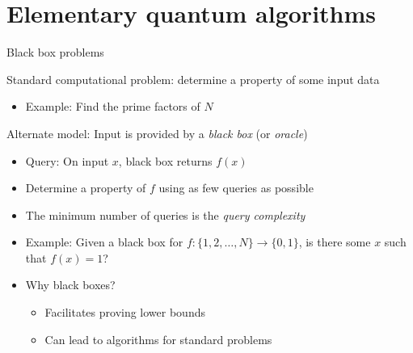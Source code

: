 
\part{Elementary quantum algorithms}
\begin{frame}
  \partpage
  \label{part:elementary}
\end{frame}


\begin{frame}{Black box problems}

Standard computational problem: determine a property of some input data
\begin{itemize}
  \item Example: Find the prime factors of $N$
\end{itemize}

\pause
\bigskip

Alternate model: Input is provided by a \emph{black box} (or \emph{oracle})
\begin{itemize}
  \item Query: On input $x$, black box returns $f(x)$ \pause
  \item Determine a property of $f$ using as few queries as possible
  \item The minimum number of queries is the \emph{query complexity} \pause
  \item Example: Given a black box for $f:\{1,2,\ldots,N\} \to \{0,1\}$,
    is there some $x$ such that $f(x)=1$? \pause
  \item Why black boxes? \pause
  \begin{itemize}
    \item Facilitates proving lower bounds \pause
    \item Can lead to algorithms for standard problems
  \end{itemize}
\end{itemize}

\end{frame}


